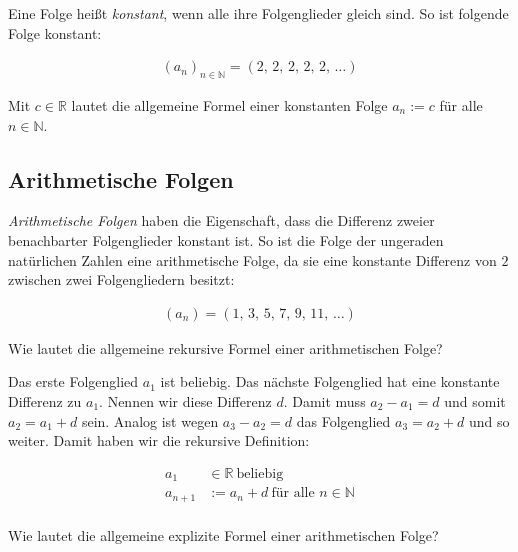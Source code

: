 \documentclass[fontsize=9pt,
               parskip=half-,
               DIV=14,
               listof=chapterentry,
               tocflat]{scrbook}
\begin{document}
Eine Folge heißt \emph{konstant}, wenn alle ihre Folgenglieder gleich sind. So ist folgende Folge konstant:

\begin{align*}
\left(a_{n}\right)_{n\in \mathbb {N} }=(2,\,2,\,2,\,2,\,2,\,\ldots )
\end{align*}

Mit $c\in \mathbb {R} $ lautet die allgemeine Formel einer konstanten Folge $a_{n}:=c$ für alle $n\in \mathbb {N} $.

\subsection{Arithmetische Folgen}

\emph{Arithmetische Folgen} haben die Eigenschaft, dass die Differenz zweier benachbarter Folgenglieder konstant ist. So ist die Folge der ungeraden natürlichen Zahlen eine arithmetische Folge, da sie eine konstante Differenz von $2$ zwischen zwei Folgengliedern besitzt:

\begin{align*}
\left(a_{n}\right)=(1,\,3,\,5,\,7,\,9,\,11,\,\ldots )
\end{align*}

\begin{mdframed}[style=semanticbox,frametitleaboveskip=3pt,innerbottommargin=3pt,frametitle=Frage]
Wie lautet die allgemeine rekursive Formel einer arithmetischen Folge?

\end{mdframed}

\begin{answer*}
Das erste Folgenglied $a_{1}$ ist beliebig. Das nächste Folgenglied hat eine konstante Differenz zu $a_{1}$. Nennen wir diese Differenz $d$. Damit muss $a_{2}-a_{1}=d$ und somit $a_{2}=a_{1}+d$ sein. Analog ist wegen $a_{3}-a_{2}=d$ das Folgenglied $a_{3}=a_{2}+d$ und so weiter. Damit haben wir die rekursive Definition:

\begin{align*}
a_{1}&\in \mathbb {R} \ {\text{beliebig}}\\a_{n+1}&:=a_{n}+d\ {\text{für alle }}n\in \mathbb {N} \\
\end{align*}

\end{answer*}

\begin{mdframed}[style=semanticbox,frametitleaboveskip=3pt,innerbottommargin=3pt,frametitle=Frage]
Wie lautet die allgemeine explizite Formel einer arithmetischen Folge?

\end{mdframed}
\end{document}
